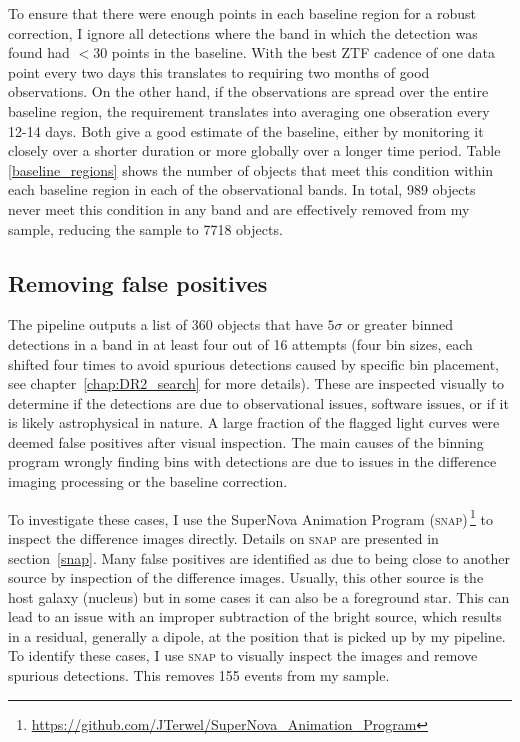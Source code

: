 \documentclass[a4paper,oneside,12pt, class=Latex/Classes/PhDthesisPSnPDF, crop=false]{standalone}
\begin{document}
To ensure that there were enough points in each baseline region for a robust correction, I ignore all detections where the band in which the detection was found had $< 30$ points in the baseline. With the best ZTF cadence of one data point every two days this translates to requiring two months of good observations. On the other hand, if the observations are spread over the entire baseline region, the requirement translates into averaging one obseration every 12-14 days. Both give a good estimate of the baseline, either by monitoring it closely over a shorter duration or more globally over a longer time period. Table \ref{baseline_regions} shows the number of objects that meet this condition within each baseline region in each of the observational bands. In total, 989 objects never meet this condition in any band and are effectively removed from my sample, reducing the sample to 7718 objects.


\subsection{Removing false positives}
\label{sec:false_positives}
The pipeline outputs a list of 360 objects that have $5\sigma$ or greater binned detections in a band in at least four out of 16 attempts (four bin sizes, each shifted four times to avoid spurious detections caused by specific bin placement, see chapter~\ref{chap:DR2_search} for more details). These are inspected visually to determine if the detections are due to observational issues, software issues, or if it is likely astrophysical in nature. A large fraction of the flagged light curves were deemed false positives after visual inspection. The main causes of the binning program wrongly finding bins with detections are due to issues in the difference imaging processing or the baseline correction.

To investigate these cases, I use the SuperNova Animation Program (\textsc{snap})\,\footnote{\url{https://github.com/JTerwel/SuperNova_Animation_Program}} to inspect the difference images directly. Details on \textsc{snap} are presented in section~\ref{snap}. Many false positives are identified as due to being close to another source by inspection of the difference images. Usually, this other source is the host galaxy (nucleus) but in some cases it can also be a foreground star. This can lead to an issue with an improper subtraction of the bright source, which results in a residual, generally a dipole, at the position that is picked up by my pipeline. To identify these cases, I use \textsc{snap} to visually inspect the images and remove spurious detections. This removes 155 events from my sample.
\end{document}
